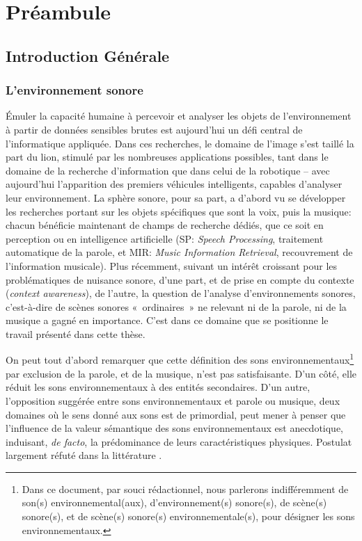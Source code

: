 \chapter{Préambule}\label{ch:pream_intro}


\section{Introduction Générale}

\subsection{L'environnement sonore}

Émuler la capacité humaine à percevoir et analyser les objets de l'environnement à partir de données sensibles brutes est aujourd'hui un défi central de l'informatique appliquée. Dans ces recherches, le domaine de l'image s'est taillé la part du lion, stimulé par les nombreuses applications possibles, tant dans le domaine de la recherche d'information que dans celui de la robotique -- avec aujourd'hui l'apparition des premiers véhicules intelligents, capables d'analyser leur environnement. La sphère sonore, pour sa part, a d'abord vu se développer les recherches portant sur les objets spécifiques que sont la voix, puis la musique: chacun bénéficie maintenant de champs de recherche dédiés, que ce soit en perception ou en intelligence artificielle (SP: \emph{Speech Processing}, traitement automatique de la parole, et MIR: \emph{Music Information Retrieval}, recouvrement de l'information musicale). Plus récemment, suivant un intérêt croissant pour les problématiques de nuisance sonore, d'une part, et de prise en compte du contexte (\emph{context awareness}), de l'autre, la question de l'analyse d'environnements sonores, c'est-à-dire de scènes sonores «~ordinaires~» ne relevant ni de la parole, ni de la musique a gagné en importance. C'est dans ce domaine que se positionne le travail présenté dans cette thèse.

On peut tout d'abord remarquer que cette définition des sons environnementaux\footnote{Dans ce document, par souci rédactionnel, nous parlerons indifféremment de son(s) environnemental(aux), d'environnement(s) sonore(s), de scène(s) sonore(s), et de scène(s) sonore(s) environnementale(s), pour désigner les sons environnementaux.} par exclusion de la parole, et de la musique, n'est pas satisfaisante. D'un côté, elle réduit les sons environnementaux à des entités secondaires. D'un autre, l'opposition suggérée entre sons environnementaux et parole ou musique, deux domaines où le sens donné aux sons est de primordial, peut mener à penser que l'influence de la valeur sémantique des sons environnementaux est anecdotique, induisant, \emph{de facto}, la prédominance de leurs caractéristiques physiques. Postulat largement réfuté dans la littérature \citep{ballas1987interpreting}.

